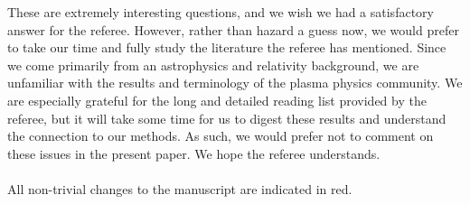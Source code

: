 \documentclass{article}
\begin{document}
These are extremely interesting questions, and we wish we had a satisfactory answer for the referee.  However, rather than hazard a guess now, we would prefer to take our time and fully study the literature the referee has mentioned.  Since we come primarily from an astrophysics and relativity background, we are unfamiliar with the results and terminology of the plasma physics community.  We are especially grateful for the long and detailed reading list provided by the referee, but it will take some time for us to digest these results and understand the connection to our methods.  As such, we would prefer not to comment on these issues in the present paper.  We hope the referee understands.\\
\\
All non-trivial changes to the manuscript are indicated in red.
\end{document}
